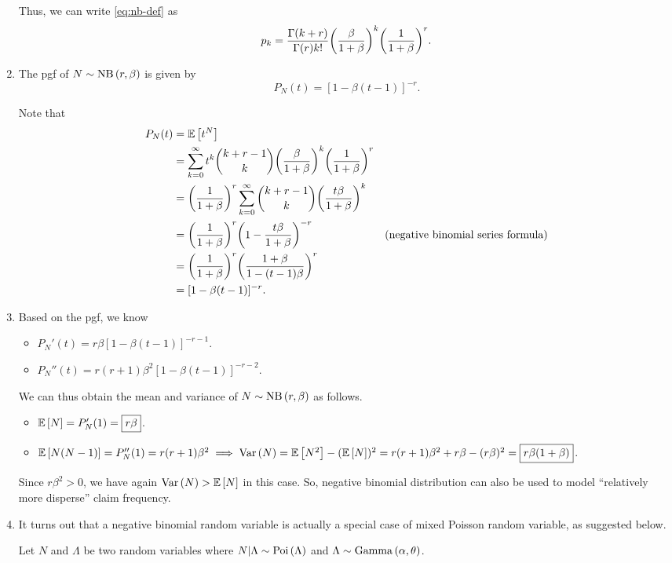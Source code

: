 \begin{enumerate}
Thus, we can write \cref{eq:nb-def} as
\[
p_k=\frac{\Gamma(k+r)}{\Gamma(r)k!}\qty(\frac{\beta}{1+\beta})^k\qty(\frac{1}{1+\beta})^{r}.
\]
\item \label{it:nb-pgf}
The pgf of \(N\sim\operatorname{NB}\left(r,\beta\right)\) is given by
\[
P_N(t)=\boxed{[1-\beta(t-1)]^{-r}}.
\]
\begin{pf}
Note that
\begin{align*}
P_N(t)
&=\mathbb{E}\left[t^N\right]\\
&=\sum_{k=0}^{\infty}t^k\binom{k+r-1}{k}\qty(\frac{\beta}{1+\beta})^k\qty(\frac{1}{1+\beta})^{r}\\
&=\qty(\frac{1}{1+\beta})^{r}\sum_{k=0}^{\infty}\binom{k+r-1}{k}\qty(\frac{t\beta}{1+\beta})^k\\
&=\qty(\frac{1}{1+\beta})^{r}\qty(1-\frac{t\beta}{1+\beta})^{-r}&\text{(negative binomial series formula)}\\
&=\qty(\frac{1}{1+\beta})^{r}\qty(\frac{1+\beta}{1-(t-1)\beta})^{r}\\
&=[1-\beta(t-1)]^{-r}.
\end{align*}
\end{pf}
\item \label{it:nb-mean-var}
Based on the pgf, we know
\begin{itemize}
\item \(P_N'(t)=r\beta[1-\beta(t-1)]^{-r-1}\).
\item \(P_N''(t)=r(r+1)\beta^2[1-\beta(t-1)]^{-r-2}\).
\end{itemize}
We can thus obtain the mean and variance of \(N\sim\operatorname{NB}\left(r,\beta\right)\) as follows.
\begin{itemize}
\item \(\mathbb{E}\left[N\right]=P_N'(1)=\boxed{r\beta}\).
\item \(\mathbb{E}\left[N(N-1)\right]=P_N''(1)=r(r+1)\beta^2\implies \operatorname{Var}\left(N\right)=\mathbb{E}\left[N^2\right]-(\mathbb{E}\left[N\right])^{2}
=r(r+1)\beta^2+r\beta-(r\beta)^2
=\boxed{r\beta(1+\beta)}\).
\end{itemize}
\begin{note}
Since \(r\beta^2>0\), we have again \(\operatorname{Var}\left(N\right)>\mathbb{E}\left[N\right]\) in this case. So,
negative binomial distribution can also be used to model ``relatively more
disperse'' claim frequency.
\end{note}
\item It turns out that a negative binomial random variable is actually a
special case of mixed Poisson random variable, as suggested below.
\begin{proposition}
\label{prp:nb-mix-pois-gamma}
Let \(N\) and \(\Lambda\) be two random variables where
\(N|\Lambda\sim\operatorname{Poi}\left(\Lambda\right)\) and \(\Lambda\sim\operatorname{Gamma}\left(\alpha,\theta\right)\).

\end{proposition}
\end{enumerate}
